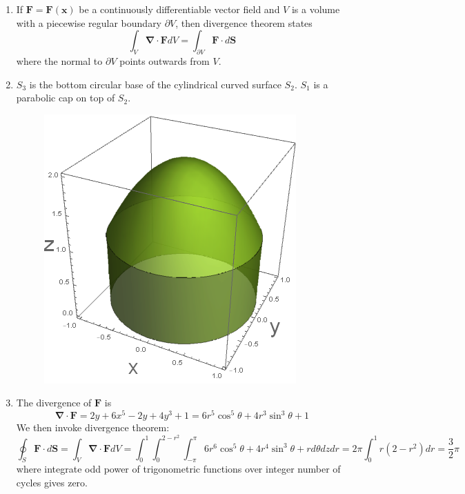 \documentclass[a4paper]{article}
\begin{document}
\begin{ans}\leavevmode
\begin{enumerate}[label=(\alph*)]
    \item If $\mathbf{F}=\mathbf{F}(\mathbf{x})$ be a continuously differentiable vector field and $V$ is a volume with a piecewise regular boundary $\partial V$, then divergence theorem states
$$\int_V\boldsymbol{\nabla}\cdot\mathbf{F}dV=\int_{\partial V}\mathbf{F}\cdot d\mathbf{S}$$
where the normal to $\partial V$ points outwards from $V$.
\item $S_3$ is the bottom circular base of the cylindrical curved surface $S_2$. $S_1$ is a parabolic cap on top of $S_2$.
\begin{figure}[H]
    \centering
    \includegraphics[scale=0.5]{2016P1Q1.png}
\end{figure}
\item The divergence of $\mathbf{F}$ is
$$\boldsymbol{\nabla}\cdot\mathbf{F}=2y+6x^5-2y+4y^3+1=6r^5\cos^5\theta+4r^3\sin^3\theta+1$$ We then invoke divergence theorem:
$$\oint_S\mathbf{F}\cdot d\mathbf{S}=\int_V\boldsymbol{\nabla}\cdot\mathbf{F}dV=\int_0^1\int_0^{2-r^2}\int_{-\pi}^\pi 6r^6\cos^5\theta+4r^4\sin^3\theta+r d\theta dzdr=2\pi\int_0^1r(2-r^2)dr=\frac{3}{2}\pi$$
where integrate odd power of trigonometric functions over integer number of cycles gives zero.
\end{enumerate}

\end{ans}
\newpage
\end{document}
